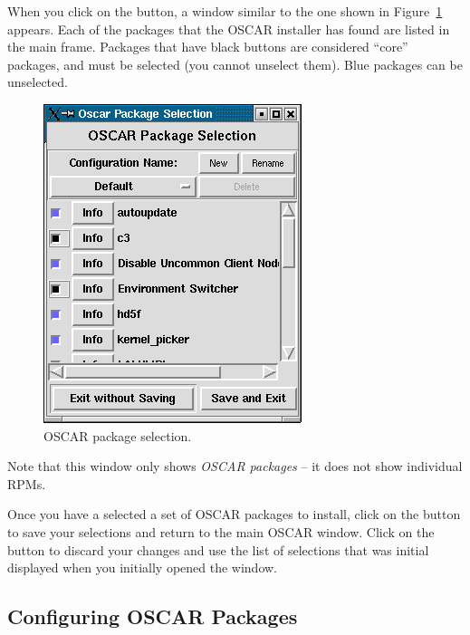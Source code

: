 When you click on the button, a window similar to the one shown in
Figure~\ref{fig:detailed-package-selection} appears.  Each of the
packages that the OSCAR installer has found are listed in the main
frame. Packages that have black buttons are considered ``core''
packages, and must be selected (you cannot unselect them).  Blue
packages can be unselected.

\begin{figure}[htbp]
  \begin{center}
    \includegraphics[scale=\imgscale]{figs/package-selection}
    \caption{OSCAR package selection.}
    \label{fig:detailed-package-selection}
  \end{center}
\end{figure}

Note that this window only shows {\em OSCAR packages} -- it does not
show individual RPMs.  

Once you have a selected a set of OSCAR packages to install, click on
the  button to save your selections and return
to the main OSCAR window.  Click on the 
button to discard your changes and use the list of selections that was
initial displayed when you initially opened the window.


\subsection{Configuring OSCAR Packages}
\label{det:configure-packages}

